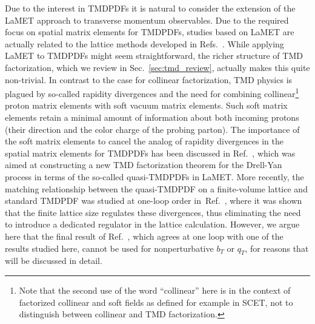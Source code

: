 \documentclass[11pt,a4paper]{article}
\DeclareRobustCommand{\sec}[1]{Sec.~\ref{sec:#1}}
\DeclareRobustCommand{\mycite}[1]{Ref.~\cite{#1}}
\DeclareRobustCommand{\mycites}[1]{Refs.~\cite{#1}}
\begin{document}
Due to the interest in TMDPDFs it is natural to consider the extension of the LaMET approach to transverse momentum observables. 
Due to the required focus on spatial matrix elements for TMDPDFs, studies based on LaMET are actually related to the lattice methods  developed in \mycites{Engelhardt:2015xja,Yoon:2016dyh,Yoon:2017qzo}.
While applying LaMET to TMDPDFs might seem straightforward,
the richer structure of TMD factorization, which we review in \sec{tmd_review}, actually makes this quite non-trivial.
In contrast to the case for collinear factorization, TMD physics is plagued by so-called
rapidity divergences and the need for combining collinear\footnote{Note that the second use of the word ``collinear'' here is in the context of factorized collinear and soft fields as defined for example in SCET, not to distinguish between collinear and TMD factorization.} proton matrix elements with soft vacuum matrix elements. Such soft matrix elements
retain a minimal amount of information about both incoming protons (their direction and the color charge of the probing parton).
The importance of the soft matrix elements to cancel the analog of rapidity divergences in the spatial matrix elements for TMDPDFs has been discussed in \mycite{Ji:2014hxa}, which was aimed at constructing a new TMD factorization theorem for the Drell-Yan process in terms of the so-called quasi-TMDPDFs in LaMET. More recently, the matching relationship between the quasi-TMDPDF on a finite-volume lattice and standard TMDPDF was studied at one-loop order in~\mycite{Ji:2018hvs}, where it was shown that the finite lattice size regulates these divergences, thus eliminating the need to introduce a dedicated regulator in the lattice calculation. 
However, we argue here that the final result of \mycite{Ji:2018hvs}, which agrees at one loop with one of the results studied here, cannot be used for nonperturbative $b_T$ or $q_T$, for reasons that will be discussed in detail.
\end{document}
